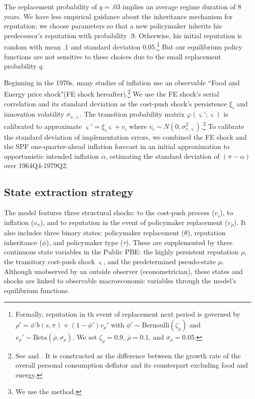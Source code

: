 \documentclass[12pt,letter,leqno]{article}
\theoremstyle{asn}
\theoremstyle{lem}
\theoremstyle{slem}
\theoremstyle{prop}
\theoremstyle{appprop}
\theoremstyle{rem}
\theoremstyle{defn}
\begin{document}
The replacement probability of $q=.03$ implies an average regime duration of 8 years. We have less empirical guidance about the inheritance mechanism for reputation: we choose parameters so that a new policymaker inherits his predecessor's reputation with probability .9. Otherwise, his initial reputation is random with mean .1 and standard deviation 0.05.\footnote{Formally, reputation in th event of replacement next period is governed by $\rho' =\phi'b(s,\pi) + (1-\phi')v_{\rho}'$ with $\phi' \sim \text{Bernoulli}(\zeta_\rho)$ and $v_{\rho}' \sim \text{Beta}(\overline{\rho},\sigma_{\rho})$. We set $\zeta_\rho=0.9$, $\overline{\rho}=0.1$, and $\sigma_{\rho}=0.05$.} But our equilibrium policy functions are not sensitive to these choices due to the small replacement probability $q$.



Beginning in the 1970s, many studies of inflation use an observable ``Food and Energy price shock"(FE shock hereafter).\footnote{See  and \cite{watson_inflation_2014}. It is constructed as the difference between the growth rate of the overall personal consumption deflator and its counterpart excluding food and energy.} We use the FE shock's serial correlation and its standard deviation as the cost-push shock's persistence $\xi_\varsigma$ and innovation volatility $\sigma _{v,\varsigma}$. The transition probability matrix $\varphi(\varsigma';\varsigma)$ is calibrated to approximate  $\varsigma'=\xi_{\varsigma}\varsigma + v_{\varsigma}$ where $v_{\varsigma}\sim N(0,\sigma^2_{v,\varsigma})$.\footnote{We use the \cite{rouwenhorst_asset_1995} method.} To calibrate the standard deviation of implementation errors, we combined the FE shock and the SPF one-quarter-ahead inflation forecast in an initial approximation to opportunistic intended inflation $\alpha$, estimating the standard deviation of $(\pi-\alpha)$ over 1964Q4-1979Q2.


\subsection{State extraction strategy}
The model features three structural shocks: to the cost-push process ($v_\varsigma$), to inflation ($v_\pi$), and to reputation in the event of policymaker replacement ($v_\rho$). It also includes three binary states: policymaker replacement ($\theta$), reputation inheritance ($\phi$), and policymaker type ($\tau$). These are supplemented by three continuous state variables in the Public PBE: the highly persistent reputation $\rho$, the transitory cost-push shock $\varsigma$, and the predetermined pseudo-state $\mu$. Although unobserved by an outside observer (econometrician), these states and shocks are linked to observable macroeconomic variables through the model’s equilibrium functions.
\end{document}

